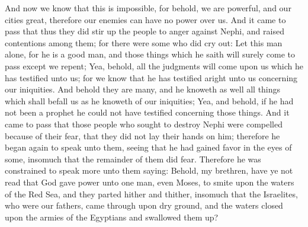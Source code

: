 And now we know that this is impossible, for behold, we are powerful, and our cities great, therefore our enemies can have no power over us.
\bverse \iffalse And it came to pass that thus they did stir up the people to anger against Nephi, and raised contentions among them; for there were some who did cry out: Let this man alone, for he is a good man, and those things which he saith will surely come to pass except we repent; \fi
And it came to pass that thus they did stir up the people to anger against Nephi, and raised contentions among them; for there were some who did cry out: Let this man alone, for he is a good man, and those things which he saith will surely come to pass except we repent;
\bverse \iffalse Yea, behold, all the judgments will come upon us which he has testified unto us; for we know that he has testified aright unto us concerning our iniquities. And behold they are many, and he knoweth as well all things which shall befall us as he knoweth of our iniquities; \fi
Yea, behold, all the judgments will come upon us which he has testified unto us; for we know that he has testified aright unto us concerning our iniquities. And behold they are many, and he knoweth as well all things which shall befall us as he knoweth of our iniquities;
\bverse \iffalse Yea, and behold, if he had not been a prophet he could not have testified concerning those things. \fi
Yea, and behold, if he had not been a prophet he could not have testified concerning those things.
\bverse \iffalse And it came to pass that those people who sought to destroy Nephi were compelled because of their fear, that they did not lay their hands on him; therefore he began again to speak unto them, seeing that he had gained favor in the eyes of some, insomuch that the remainder of them did fear. \fi
And it came to pass that those people who sought to destroy Nephi were compelled because of their fear, that they did not lay their hands on him; therefore he began again to speak unto them, seeing that he had gained favor in the eyes of some, insomuch that the remainder of them did fear.
\bverse \iffalse Therefore he was constrained to speak more unto them saying: Behold, my brethren, have ye not read that God gave power unto one man, even Moses, to smite upon the waters of the Red Sea, and they parted hither and thither, insomuch that the Israelites, who were our fathers, came through upon dry ground, and the waters closed upon the armies of the Egyptians and swallowed them up? \fi
Therefore he was constrained to speak more unto them saying: Behold, my brethren, have ye not read that God gave power unto one man, even Moses, to smite upon the waters of the Red Sea, and they parted hither and thither, insomuch that the Israelites, who were our fathers, came through upon dry ground, and the waters closed upon the armies of the Egyptians and swallowed them up?
